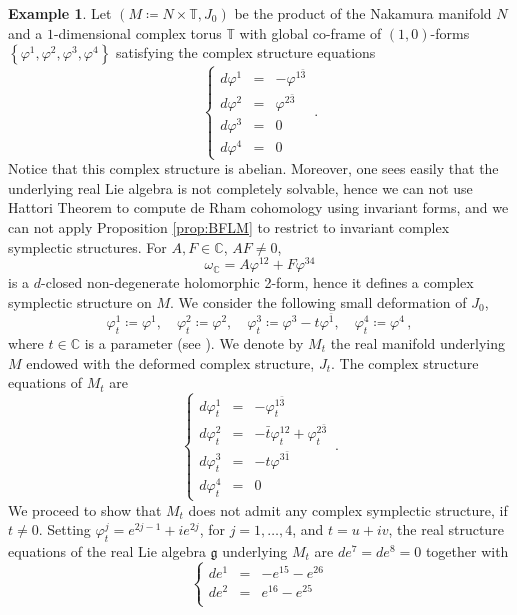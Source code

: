 \documentclass[a4paper]{amsart}
\theoremstyle{definition}
\newtheorem{example}[theorem]{Example}
\theoremstyle{remark}
\newcommand{\bC}{{\mathbb C}}
\numberwithin{equation}{section}
\begin{document}
\begin{example}
Let $(M\coloneqq N\times\mathbb{T},J_0)$ be the product of the Nakamura manifold $N$ and a $1$-dimensional complex torus $\mathbb{T}$ with 
global co-frame of $(1,0)$-forms $\left\lbrace\varphi^1,\varphi^2,\varphi^3,\varphi^4\right\rbrace$ satisfying the
complex structure equations
\[
\left\lbrace
\begin{array}{lcl}
d\varphi^1 & =& -\varphi^{1\bar3}\\
d\varphi^2 & = & \varphi^{2\bar3}\\
d\varphi^3 & = & 0\\
d\varphi^4 & = & 0
\end{array}
\right.\,.
\]
Notice that this complex structure is abelian. Moreover, one sees easily that the underlying real Lie algebra is not completely solvable, hence we can not use Hattori Theorem to compute de Rham cohomology using invariant forms, and we can not apply Proposition \ref{prop:BFLM} to restrict to invariant complex symplectic structures. For $A,F\in\mathbb{C}$, $AF\neq 0$,
\[
\omega_{\mathbb{C}}=A\varphi^{12}+F\varphi^{34}
\]
is a $d$-closed non-degenerate holomorphic 2-form, hence it defines a complex symplectic structure on $M$. We consider the following small deformation of $J_0$,
\[
\varphi^1_t\coloneqq\varphi^1,\quad
\varphi^2_t\coloneqq\varphi^2,\quad
\varphi^3_t\coloneqq\varphi^3-t\varphi^{\bar 1},\quad
\varphi^4_t\coloneqq\varphi^4\,,
\]
where $t\in\bC$ is a parameter (see \cite[Theorem 3.3]{angella-otal-ugarte-villacampa}). We denote by $M_t$ the real manifold underlying $M$ endowed with the deformed complex structure, $J_t$. The complex structure equations of $M_t$ are
\[
\left\lbrace
\begin{array}{lcl}
d\varphi^1_t & =& -\varphi^{1\bar3}_t\\
d\varphi^2_t & = & -\bar t\varphi^{12}_t+ \varphi^{2\bar3}_t\\
d\varphi^3_t & = & -t\varphi^{3\bar 1}\\
d\varphi^4_t & = & 0
\end{array}
\right.\,.
\]
We proceed to show that $M_t$ does not admit any complex symplectic structure, if $t\neq 0$. Setting $\varphi^j_t=e^{2j-1}+ie^{2j}$, for $j=1,\ldots,4$, and $t=u+iv$, the real structure equations of the real Lie algebra $\mathfrak{g}$ underlying $M_t$ are $de^7=de^8=0$ together with
\[
\left\lbrace
\begin{array}{lcl}
de^1 & = & -e^{15}-e^{26}\\
de^2 & = & e^{16}-e^{25}\\

\end{array}\]
\end{example}
\end{document}
